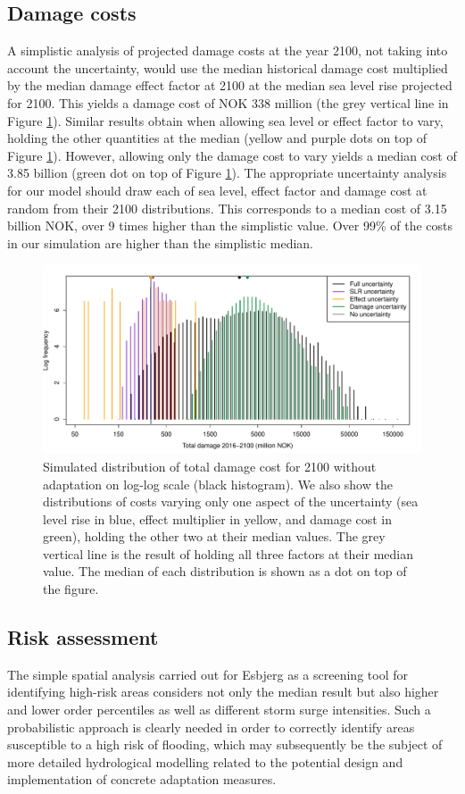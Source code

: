 \documentclass[draft,linenumbers]{agujournal}
\begin{document}
\subsection{Damage costs}
A simplistic analysis of projected damage costs at the year 2100, not taking into account the uncertainty, would use  the median  historical damage cost multiplied by  the median damage effect factor at 2100 at the median sea level rise projected for 2100. This yields a damage cost of NOK 338 million (the grey vertical line in Figure \ref{fig:costunc}). Similar results obtain when allowing sea level or effect factor to vary, holding the other quantities at the median (yellow and purple dots on top of Figure \ref{fig:costunc}). However, allowing only the damage cost to vary yields a median cost of 3.85 billion (green dot on top of Figure \ref{fig:costunc}). The appropriate uncertainty analysis for our model should draw each of sea level, effect factor and damage cost at random from their 2100 distributions. This corresponds to a median cost of 3.15 billion NOK, over 9 times higher than the simplistic value. Over 99\% of the costs in our simulation are higher than the simplistic median.

\begin{figure}[!hbpt]
\begin{center}
\includegraphics[width=0.8\linewidth]{UncertaintyLog.pdf}
\caption{Simulated distribution of total damage cost for 2100 without adaptation on log-log scale (black histogram). We also show the distributions of costs varying only one aspect of the uncertainty (sea level rise in blue, effect multiplier in yellow, and damage cost in green), holding the other two at their median values. The grey vertical line is the result of holding all three factors at their median value. The median of each distribution is shown as a dot on top of the figure.} 
\label{fig:costunc}
\end{center}
\end{figure}

\subsection{Risk assessment}
The simple spatial analysis carried out for Esbjerg as a screening tool for identifying high-risk areas considers not only the median result but also higher and lower order percentiles as well as different storm surge intensities. Such a probabilistic approach is clearly needed in order to correctly identify areas susceptible to a high risk of flooding, which may subsequently be the subject of more detailed hydrological modelling related to the potential design and implementation of concrete adaptation measures.
\end{document}
